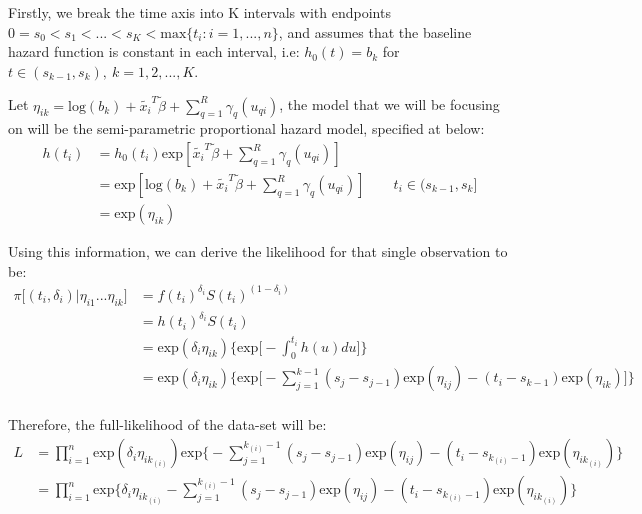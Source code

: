 \documentclass[]{article}
\begin{document}
Firstly, we break the time axis into K intervals with endpoints
\(0=s_0<s_1<...<s_K < \text{max}\{t_i:i=1,...,n\}\), and assumes that
the baseline hazard function is constant in each interval, i.e:
\(h_0(t) = b_k\) for \(t\in(s_{k-1},s_k), \ k=1,2, ...,K\).

Let
\(\eta_{ik} = \text{log}(b_k)+\tilde{x_i}^T\tilde{\beta}+\sum_{q=1}^{R} \gamma_q(u_{qi})\),
the model that we will be focusing on will be the semi-parametric
proportional hazard model, specified at below:
\begin{equation}\begin{aligned}\label{eqn:phmodel}
h(t_i) &= h_0(t_i)\text{exp}[\tilde{x_i}^T\tilde{\beta}+\sum_{q=1}^{R} \gamma_q(u_{qi})]\\
       &= \text{exp}[\text{log}(b_k)+\tilde{x_i}^T\tilde{\beta}+\sum_{q=1}^{R} \gamma_q(u_{qi})] \qquad t_i\in(s_{k-1},s_k] \\
       &= \text{exp}(\eta_{ik})
\end{aligned}\end{equation}

Using this information, we can derive the likelihood for that single
observation to be: \begin{equation}\begin{aligned}\label{eqn:singlelike}
\pi\big[(t_i,\delta_i )  | \eta_{i1} ... \eta_{ik} \big] &= f(t_i)^{\delta_i}S(t_i)^{(1- \delta_i)}\\
  &= h(t_i)^{\delta_i}S(t_i) \\
  &= \text{exp}(\delta_i \eta_{ik})\bigg\{ \text{exp} \big[ -\int_{0}^{t_i} h(u) du\big ] \bigg\} \\
  &= \text{exp}(\delta_i \eta_{ik})\bigg \{\text{exp}\big[-\sum_{j=1}^{k-1} (s_{j}-s_{j-1})\text {exp} (\eta_{ij}) - (t_i-s_{k-1})\text{exp}(\eta_{ik})\big]\bigg \}\\
\end{aligned}\end{equation}

Therefore, the full-likelihood of the data-set will be:
\begin{equation}\begin{aligned}\label{eqn:fulllike}
L &=  \prod_{i=1}^{n} \text{exp}(\delta_i \eta_{ik_{(i)}}) \text{exp} \bigg\{-\sum_{j=1}^{k_{(i)}-1} (s_{j}-s_{j-1})\text{exp}(\eta_{ij})-(t_i - s_{k_{(i)}-1})\text{exp}(\eta_{ik_{(i)}})\bigg \} \\
  &= \prod_{i=1}^{n} \text{exp} \big \{\delta_i \eta_{ik_{(i)}} -\sum_{j=1}^{k_{(i)}-1} (s_{j}-s_{j-1})\text{exp}(\eta_{ij})-(t_i - s_{k_{(i)}-1})\text{exp}(\eta_{ik_{(i)}}) \big \}
\end{aligned}\end{equation}
\end{document}
